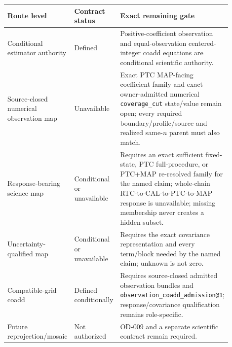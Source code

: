 \documentclass[10pt]{article}
\newcommand{\code}[1]{\nolinkurl{#1}}
\begin{document}
\begin{longtable}{L{0.25\linewidth}L{0.20\linewidth}L{0.45\linewidth}}
\toprule
Route level & Contract status & Exact remaining gate\\
\midrule
Conditional estimator authority & Defined & Positive-coefficient observation and equal-observation centered-integer coadd equations are conditional scientific authority.\\
Source-closed numerical observation map & Unavailable & Exact PTC MAP-facing coefficient family and exact owner-admitted numerical \code{coverage\_cut} state/value remain open; every required boundary/profile/source and realized same-\(n\) parent must also match.\\
Response-bearing science map & Conditional or unavailable & Requires an exact sufficient fixed-state, PTC full-procedure, or PTC+MAP re-resolved family for the named claim; whole-chain RTC-to-CAL-to-PTC-to-MAP response is unavailable; missing membership never creates a hidden subset.\\
Uncertainty-qualified map & Conditional or unavailable & Requires the exact covariance representation and every term/block needed by the named claim; unknown is not zero.\\
Compatible-grid coadd & Defined conditionally & Requires source-closed admitted observation bundles and \code{observation\_coadd\_admission@1}; response/covariance qualification remains role-specific.\\
Future reprojection/mosaic & Not authorized & OD-009 and a separate scientific contract remain required.\\
\bottomrule
\end{longtable}
\end{document}
